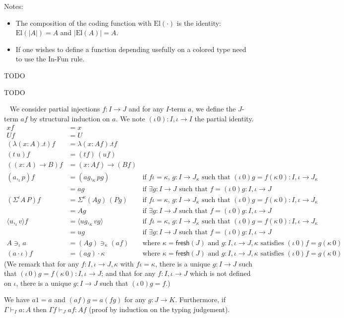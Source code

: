 \documentclass[english]{PaperTools/latex/lipics}
\newcommand\CP[3]{(#2,_{#1} #3)}
\newcommand\op[1]{∋_{#1}}
\newcommand\ip[3]{Σ^{#1} {#2}\,{#3}}
\newcommand\fp[3]{⟨#2 ,_{#1} #3⟩}
\def\fresh#1{\mathsf{fresh}(#1)}
\def\El#1{\mathrm{El}(#1)}
\begin{document}
Notes:

\begin{itemize}
  \item The composition of the coding function with $\El{·}$ is the
    identity: $\El{|A|} = A$ and $|\El{A}| = A$.
\item If one wishes to define a function depending usefully on a colored type
  need to use the {\sc In-Fun} rule.
\end{itemize}

\begin{definition}[$I$-term]
TODO
\end{definition}
\begin{definition}[$\fresh I$]
TODO
\end{definition}

\begin{definition}~
  We consider partial injections $f : I → J$ and for any $I$-term $a$,
  we define the $J$-term $af$ by structural induction on $a$.
  We note $(ι\,0) : I,ι → I$ the partial identity.
\begin{align*}
  x f & = x \\
  U f & = U \\
  (λ(x:A).t) f &= λ(x:Af).tf \\
  (t\,u) f &= (tf) \, (uf) \\
  ((x:A)→B) f &= (x:Af)→(Bf) \\
  \CP {ι} a p f &= \CP {κ} {ag} {pg}
    & \text{if $fι = κ$, $g : I→J_κ$ such that $(ι\,0)g = f(κ\,0) : I,ι → J_κ$} \\
                &= ag
    & \text{if $∃g : I→J$ such that $f = (ι\,0)g : I,ι → J$} \\
  (\ip {ι} A P) f &= \ip {κ} {(Ag)} {(Pg)}
    & \text{if $fι = κ$, $g : I→J_κ$ such that $(ι\,0)g = f(κ\,0) : I,ι → J_κ$} \\
                &= Ag
    & \text{if $∃g : I→J$ such that $f = (ι\,0)g : I,ι → J$} \\
  \fp {ι} u v f &= \fp {κ} {ug} {vg}
    & \text{if $fι = κ$, $g : I→J_κ$ such that $(ι\,0)g = f(κ\,0) : I,ι → J_κ$} \\
                &= ug
    & \text{if $∃g : I→J$ such that $f = (ι\,0)g : I,ι → J$} \\
  A \op {ι} a &= (Ag) \op {κ} (af)
    & \text{where $κ = \fresh J$ and $g:I,ι → J,κ$ satisfies $(ι\,0)f = g(κ\,0)$} \\
  (a · ι) f &= (ag) · κ
    & \text{where $κ = \fresh J$ and $g:I,ι → J,κ$ satisfies $(ι\,0)f = g(κ\,0)$}
\end{align*}
  (We remark that for any $f : I,ι → J,κ$ with $fι=κ$, there is a
  unique $g : I → J$ such that $(ι\,0)g = f(κ\,0) : I,ι → J$;
  and that for any $f : I,ι → J$ which is not defined on $ι$, there is
  a unique $g : I → J$ such that $(ι\,0)g = f$.)

  We have $a1 = a$ and $(af)g = a(fg)$ for any $g : J → K$.
  Furthermore, if $Γ ⊢_I a : A$ then $Γ f ⊢_J af : Af$ (proof by
  induction on the typing judgement).
\end{definition}
\end{document}
